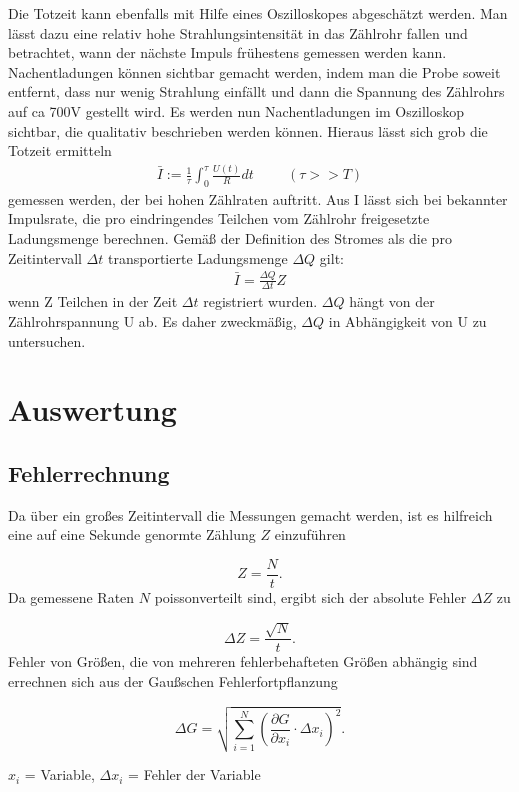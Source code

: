 Die Totzeit kann ebenfalls mit Hilfe eines Oszilloskopes abgeschätzt werden. Man lässt dazu eine relativ hohe Strahlungsintensität in das Zählrohr fallen und betrachtet, wann der nächste Impuls frühestens gemessen werden kann.
Nachentladungen können sichtbar gemacht werden, indem man die Probe soweit entfernt, dass nur wenig Strahlung einfällt und dann die 
Spannung des Zählrohrs auf ca 700V gestellt wird. Es werden nun Nachentladungen im Oszilloskop sichtbar, die qualitativ beschrieben 
werden können. Hieraus lässt sich grob die Totzeit ermitteln
\begin{align}
	\bar{I}:= \frac{1}{\tau} \int_0^\tau \frac{U(t)}{R}dt \hspace{1cm} (\tau >> T)
\end{align}
gemessen werden, der bei hohen Zählraten auftritt. Aus I lässt sich bei bekannter Impulsrate, die pro eindringendes Teilchen vom Zählrohr freigesetzte Ladungsmenge berechnen. Gemäß der Definition des Stromes als die pro Zeitintervall $\Delta t$ transportierte Ladungsmenge $\Delta Q$ gilt:
\begin{align}
\bar{I} = \frac{\Delta Q}{\Delta t} Z
\end{align}
wenn Z Teilchen in der Zeit $\Delta t$ registriert wurden.
$\Delta Q$ hängt von der Zählrohrspannung U ab. Es daher zweckmäßig, $\Delta Q$ in Abhängigkeit von U zu untersuchen.


\section{Auswertung}
\subsection{Fehlerrechnung}
Da über ein großes Zeitintervall die Messungen gemacht werden, ist es hilfreich eine auf eine Sekunde genormte Zählung $Z$ einzuführen

\begin{equation}
 Z = \frac{N}{t}.
\end{equation}
Da gemessene Raten $N$ poissonverteilt sind, ergibt sich der absolute Fehler $\Delta Z$ zu

\begin{equation}
 \Delta Z = \frac{\sqrt{N}}{t}.
\end{equation}
Fehler von Größen, die von mehreren fehlerbehafteten Größen abhängig sind errechnen sich aus der Gaußschen Fehlerfortpflanzung

\begin{formel}[H]
\begin{equation}
\Delta G = \sqrt{\sum_{i=1}^{N}\left( \frac{\partial G}{\partial x_i}\cdot \Delta x_i\right)^2}.
\label{eq_gauss}
\end{equation}
\caption*{\small{$x_i$ = Variable, $\Delta x_i$ = Fehler der Variable}}
\end{formel}

